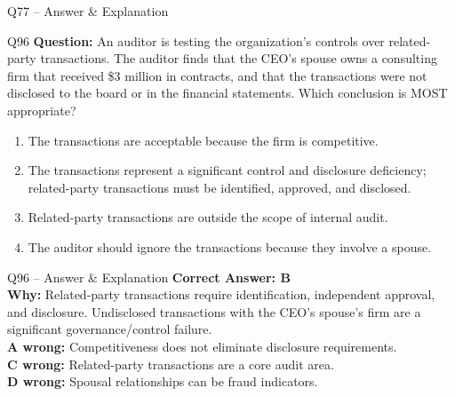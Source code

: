 \documentclass[aspectratio=169,10pt]{beamer}
\begin{document}
\begin{frame}[t]{Q77 -- Answer \& Explanation}
	\begin{frame}[t]{Q96}
		\small
		\textbf{Question:} An auditor is testing the organization's controls over related-party transactions. The auditor finds that the CEO's spouse owns a consulting firm that received \$3 million in contracts, and that the transactions were not disclosed to the board or in the financial statements. Which conclusion is MOST appropriate?
		\begin{enumerate}[label=\Alph*.,itemsep=1pt,topsep=2pt]
			\item The transactions are acceptable because the firm is competitive.
			\item The transactions represent a significant control and disclosure deficiency; related-party transactions must be identified, approved, and disclosed.
			\item Related-party transactions are outside the scope of internal audit.
			\item The auditor should ignore the transactions because they involve a spouse.
		\end{enumerate}
	\end{frame}
	
	\begin{frame}[t]{Q96 -- Answer \& Explanation}
		\small
		\textbf{Correct Answer: B} \\[4pt]
		\textbf{Why:} Related-party transactions require identification, independent approval, and disclosure. Undisclosed transactions with the CEO's spouse's firm are a significant governance/control failure. \\[4pt]
		\textbf{A wrong:} Competitiveness does not eliminate disclosure requirements. \\[2pt]
		\textbf{C wrong:} Related-party transactions are a core audit area. \\[2pt]
		\textbf{D wrong:} Spousal relationships can be fraud indicators.
	\end{frame}
	

\end{frame}
\end{document}
